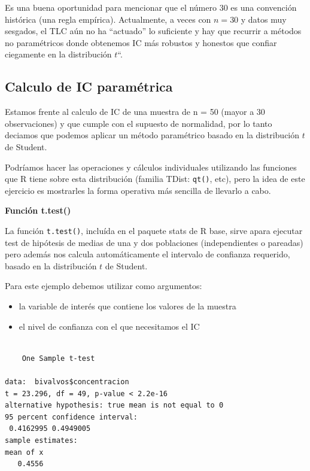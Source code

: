 \documentclass[
  spanish,
  a4paper,
]{scrbook}
\newenvironment{Shaded}{\begin{snugshade}}{\end{snugshade}}
\newcommand{\AttributeTok}[1]{\textcolor[rgb]{0.40,0.45,0.13}{#1}}
\newcommand{\FloatTok}[1]{\textcolor[rgb]{0.68,0.00,0.00}{#1}}
\newcommand{\FunctionTok}[1]{\textcolor[rgb]{0.28,0.35,0.67}{#1}}
\newcommand{\NormalTok}[1]{\textcolor[rgb]{0.00,0.23,0.31}{#1}}
\newcommand{\SpecialCharTok}[1]{\textcolor[rgb]{0.37,0.37,0.37}{#1}}
\providecommand{\tightlist}{%
  \setlength{\itemsep}{0pt}\setlength{\parskip}{0pt}}
\begin{document}
Es una buena oportunidad para mencionar que el número 30 es una
convención histórica (una regla empírica). Actualmente, a veces con
\(n=30\) y datos muy sesgados, el TLC aún no ha ``actuado'' lo
suficiente y hay que recurrir a métodos no paramétricos donde obtenemos
IC más robustos y honestos que confiar ciegamente en la distribución
\(t\)``.

\subsection{Calculo de IC
paramétrica}\label{calculo-de-ic-paramuxe9trica}

Estamos frente al calculo de IC de una muestra de n = 50 (mayor a 30
observaciones) y que cumple con el supuesto de normalidad, por lo tanto
deciamos que podemos aplicar un método paramétrico basado en la
distribución \(t\) de Student.

Podríamos hacer las operaciones y cálculos individuales utilizando las
funciones que R tiene sobre esta distribución (familia TDist:
\texttt{qt()}, etc), pero la idea de este ejercicio es mostrarles la
forma operativa más sencilla de llevarlo a cabo.

\textbf{Función t.test()}

La función \texttt{t.test()}, incluída en el paquete stats de R base,
sirve apara ejecutar test de hipótesis de medias de una y dos
poblaciones (independientes o pareadas) pero además nos calcula
automáticamente el intervalo de confianza requerido, basado en la
distribución \(t\) de Student.

Para este ejemplo debemos utilizar como argumentos:

\begin{itemize}
\tightlist
\item
  la variable de interés que contiene los valores de la muestra
\item
  el nivel de confianza con el que necesitamos el IC
\end{itemize}

\begin{Shaded}
\end{Shaded}

\begin{verbatim}

    One Sample t-test

data:  bivalvos$concentracion
t = 23.296, df = 49, p-value < 2.2e-16
alternative hypothesis: true mean is not equal to 0
95 percent confidence interval:
 0.4162995 0.4949005
sample estimates:
mean of x 
   0.4556 
\end{verbatim}
\end{document}

